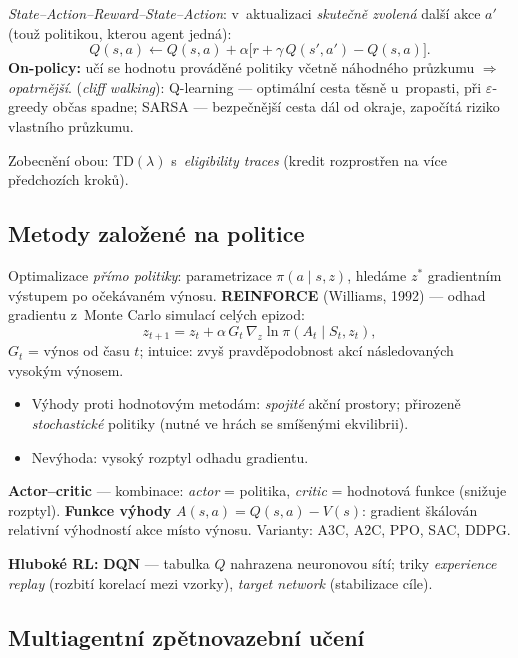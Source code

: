 \documentclass[11pt,a4paper]{article}
\theoremstyle{definition}
\begin{document}
\begin{defbox}[SARSA]
\emph{State--Action--Reward--State--Action}: v~aktualizaci \emph{skutečně zvolená} další akce
$a'$ (touž politikou, kterou agent jedná):
\[
Q(s,a) \leftarrow Q(s,a) + \alpha\big[r + \gamma\, Q(s',a') - Q(s,a)\big].
\]
\textbf{On-policy:} učí se hodnotu prováděné politiky včetně náhodného průzkumu $\Rightarrow$
\emph{opatrnější}.  (\emph{cliff walking}): Q-learning --- optimální cesta
těsně u~propasti, při $\varepsilon$-greedy občas spadne; SARSA --- bezpečnější cesta dál od
okraje, započítá riziko vlastního průzkumu.

Zobecnění obou: $\mathrm{TD}(\lambda)$ s~\emph{eligibility traces} (kredit rozprostřen na více
předchozích kroků).
\end{defbox}

\subsection{Metody založené na politice}

\begin{defbox}
Optimalizace \emph{přímo politiky}: parametrizace $\pi(a \mid s, z)$, hledáme $z^*$
gradientním výstupem po očekávaném výnosu. \textbf{REINFORCE} (Williams, 1992) --- odhad
gradientu z~Monte Carlo simulací celých epizod:
\[
z_{t+1} = z_t + \alpha\, G_t\, \nabla_z \ln \pi(A_t \mid S_t, z_t),
\]
$G_t$ = výnos od času $t$; intuice: zvyš pravděpodobnost akcí následovaných vysokým výnosem.
\begin{itemize}
\item Výhody proti hodnotovým metodám: \emph{spojité} akční prostory; přirozeně
  \emph{stochastické} politiky (nutné ve hrách se smíšenými ekvilibrii).
\item Nevýhoda: vysoký rozptyl odhadu gradientu.
\end{itemize}

\textbf{Actor--critic} --- kombinace: \emph{actor} = politika, \emph{critic} = hodnotová
funkce (snižuje rozptyl). \textbf{Funkce výhody} $A(s,a) = Q(s,a) - V(s)$: gradient škálován
relativní výhodností akce místo výnosu. Varianty: A3C, A2C, PPO, SAC, DDPG.

\textbf{Hluboké RL:} \textbf{DQN} --- tabulka $Q$ nahrazena neuronovou sítí; triky
\emph{experience replay} (rozbití korelací mezi vzorky), \emph{target network} (stabilizace
cíle).
\end{defbox}

\subsection{Multiagentní zpětnovazební učení}
\end{document}
